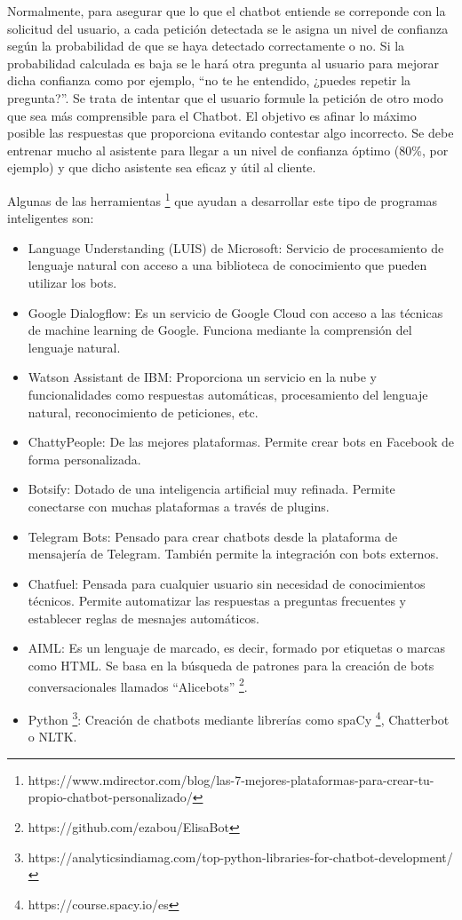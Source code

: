 Normalmente, para asegurar que lo que el chatbot entiende se correponde con la solicitud del usuario, a cada petición detectada se le asigna un nivel de confianza según la probabilidad de que se haya detectado correctamente o no. Si la probabilidad calculada es baja se le hará otra pregunta al usuario para mejorar dicha confianza como por ejemplo, ``no te he entendido, ¿puedes repetir la pregunta?''. Se trata de intentar que el usuario formule la petición de otro modo que sea más comprensible para el Chatbot. El objetivo es afinar lo máximo posible las respuestas que proporciona evitando contestar algo incorrecto. Se debe entrenar mucho al asistente para llegar a un nivel de confianza óptimo (80\%, por ejemplo) y que dicho asistente sea eficaz y útil al cliente.

Algunas de las herramientas \footnote{https://www.mdirector.com/blog/las-7-mejores-plataformas-para-crear-tu-propio-chatbot-personalizado/} que ayudan a desarrollar este tipo de programas inteligentes son:

\begin{itemize}
	\item Language Understanding (LUIS) de Microsoft: Servicio de procesamiento de lenguaje natural con acceso a una biblioteca de conocimiento que pueden utilizar los bots.
	\item Google Dialogflow: Es un servicio de Google Cloud con acceso a las técnicas de machine learning de Google. Funciona mediante la comprensión del lenguaje natural.
	\item Watson Assistant de IBM: Proporciona un servicio en la nube y funcionalidades como respuestas automáticas, procesamiento del lenguaje natural, reconocimiento de peticiones, etc.
	\item ChattyPeople: De las mejores plataformas. Permite crear bots en Facebook de forma personalizada.
	\item Botsify: Dotado de una inteligencia artificial muy refinada. Permite conectarse con muchas plataformas a través de plugins. 
	\item Telegram Bots: Pensado para crear chatbots desde la plataforma de mensajería de Telegram. También permite la integración con bots externos.
	\item Chatfuel: Pensada para cualquier usuario sin necesidad de conocimientos técnicos. Permite automatizar las respuestas a preguntas frecuentes y establecer reglas de mesnajes automáticos.
	\item AIML: Es un lenguaje de marcado, es decir, formado por etiquetas o marcas como HTML. Se basa en la búsqueda de patrones para la creación de bots conversacionales llamados ``Alicebots'' \footnote{https://github.com/ezabou/ElisaBot}. 
	\item Python \footnote{https://analyticsindiamag.com/top-python-libraries-for-chatbot-development/}: Creación de chatbots mediante librerías como spaCy \footnote{https://course.spacy.io/es}, Chatterbot o NLTK.
\end{itemize} 

